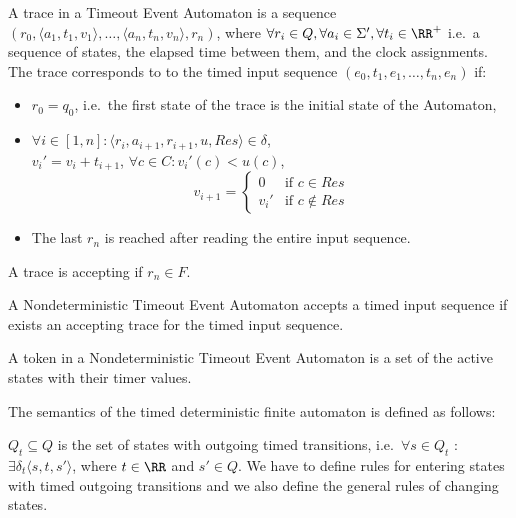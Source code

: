 			\begin{dfn}
			\label{dfn:cep:tea:trace}
			A trace in a Timeout Event Automaton is a sequence
			$(r_0, \langle a_1, t_1, v_1\rangle, \dots, \langle a_n, t_n, v_n \rangle, r_n)$, where $\forall r_i \in Q, \forall a_i \in \Sigma', \forall t_i \in \RR^+$ i.e.~a sequence of states, the elapsed time between them, and the clock assignments. The trace corresponds to to the timed input sequence $(e_0, t_1, e_1, \dots, t_n, e_n)$ if:
			\begin{itemize}
				\item $r_0 = q_0$, i.e.~the first state of the trace is the initial state of the Automaton,
				\item $\forall i \in [1,n] \colon \langle r_i, a_{i+1}, r_{i+1}, u, \mathit{Res} \rangle \in \delta$, \\
					${v_i}' = v_i + t_{i+1}$, $\forall c \in C \colon {v_i}'(c) < u(c)$,\\
					$$v_{i+1} = \begin{cases}
									0      & \text{if\ } c \in    \mathit{Res} \\
									{v_i}' & \text{if\ } c \notin \mathit{Res}
								\end{cases}$$
				\item The last $r_n$ is reached after reading the entire input sequence.	
			\end{itemize}
			A trace is accepting if $r_n \in F$.
			\end{dfn}
			
			\begin{dfn}
				\label{dfn:cep:tea:accepting}
				A Nondeterministic Timeout Event Automaton accepts a timed input sequence if exists an accepting trace for the timed input sequence.
			\end{dfn}
			
			\begin{dfn}
				\label{dfn:cep:tea:token}
				A token in a Nondeterministic Timeout Event Automaton is a set of the active states with their timer values.
			\end{dfn}
			
			The semantics of the timed deterministic finite automaton is defined as follows:
			
			
			$Q_t \subseteq Q$ is the set of states with outgoing timed transitions, 
			i.e.~$\forall s \in Q_t$ : $ \exists \delta_t\langle s, t, s' \rangle$, where $t \in \RR$ and $s' \in Q$.
			We have to define rules for entering states with timed outgoing transitions and we also define the general rules of changing states. 
			
